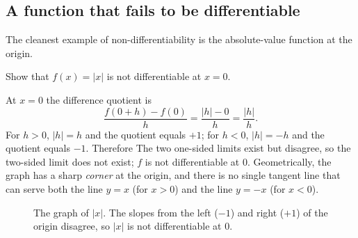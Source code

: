 \subsection{A function that fails to be differentiable}

The cleanest example of non-differentiability is the absolute-value function at the origin.

\begin{workedexample}
\begin{example}\label{ex:abs-not-differentiable}
Show that \(f(x) = \lvert x \rvert\) is not differentiable at \(x = 0\).
\end{example}

\begin{solution}
At \(x = 0\) the difference quotient is
\[
\frac{f(0 + h) - f(0)}{h} = \frac{\lvert h \rvert - 0}{h} = \frac{\lvert h \rvert}{h}.
\]
For \(h > 0\), \(\lvert h \rvert = h\) and the quotient equals \(+1\); for \(h < 0\), \(\lvert h \rvert = -h\) and the quotient equals \(-1\). Therefore
The two one-sided limits exist but disagree, so the two-sided limit does not exist; \(f\) is not differentiable at \(0\). Geometrically, the graph has a sharp \emph{corner} at the origin, and there is no single tangent line that can serve both the line \(y = x\) (for \(x > 0\)) and the line \(y = -x\) (for \(x < 0\)).
\end{solution}
\end{workedexample}

\begin{figure}[H]
\centering
{}
\caption{The graph of \(\lvert x \rvert\). The slopes from the left (\(-1\)) and right (\(+1\)) of the origin disagree, so \(\lvert x \rvert\) is not differentiable at \(0\).}
\label{fig:abs-corner}
\end{figure}

